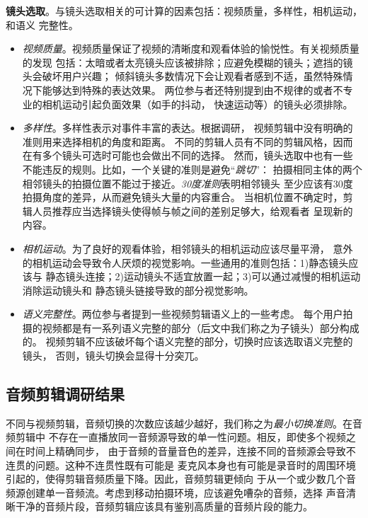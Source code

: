 \textbf{镜头选取}。与镜头选取相关的可计算的因素包括：视频质量，多样性，相机运动，和语义
完整性。
\begin{itemize}
    \item
        \emph{视频质量}。视频质量保证了视频的清晰度和观看体验的愉悦性。有关视频质量的发现
        包括：太暗或者太亮镜头应该被排除；应避免模糊的镜头；遮挡的镜头会破坏用户兴趣；
        倾斜镜头多数情况下会让观看者感到不适，虽然特殊情况下能够达到特殊的表达效果。
        两位参与者还特别提到由不规律的或者不专业的相机运动引起负面效果（如手的抖动，
        快速运动等）的镜头必须排除。
    \item \emph{多样性}。多样性表示对事件丰富的表达。根据调研，
        视频剪辑中没有明确的准则用来选择相机的角度和距离。
        不同的剪辑人员有不同的剪辑风格，因而在有多个镜头可选时可能也会做出不同的选择。
        然而，镜头选取中也有一些不能违反的规则。比如，一个关键的准则是避免``\emph{跳切}''：
        拍摄相同主体的两个相邻镜头的拍摄位置不能过于接近。\emph{30度准则}表明相邻镜头
        至少应该有30度拍摄角度的差异，从而避免镜头大量的内容重合。
        当相机位置不确定时，剪辑人员推荐应当选择镜头使得帧与帧之间的差别足够大，给观看者
        呈现新的内容。
    \item \emph{相机运动}。为了良好的观看体验，相邻镜头的相机运动应该尽量平滑，
        意外的相机运动会导致令人厌烦的视觉影响。一些通用的准则包括：1)静态镜头应该与
        静态镜头连接；2)运动镜头不适宜放置一起；3)可以通过减慢的相机运动消除运动镜头和
        静态镜头链接导致的部分视觉影响。
    \item \emph{语义完整性}。两位参与者提到一些视频剪辑语义上的一些考虑。
        每个用户拍摄的视频都是有一系列语义完整的部分（后文中我们称之为子镜头）部分构成的。
        视频剪辑不应该破坏每个语义完整的部分，切换时应该选取语义完整的镜头，
        否则，镜头切换会显得十分突兀。
\end{itemize}

\subsection{音频剪辑调研结果}
不同与视频剪辑，音频切换的次数应该越少越好，我们称之为\emph{最小切换准则}。在音频剪辑中
不存在一直播放同一音频源导致的单一性问题。相反，即使多个视频之间在时间上精确同步，
由于音频的音量音色的差异，连接不同的音频源会导致不连贯的问题。这种不连贯性既有可能是
麦克风本身也有可能是录音时的周围环境引起的，使得剪辑音频质量下降。因此，音频剪辑更倾向
于从一个或少数几个音频源创建单一音频流。考虑到移动拍摄环境，应该避免嘈杂的音频，选择
声音清晰干净的音频片段，音频剪辑应该具有鉴别高质量的音频片段的能力。

